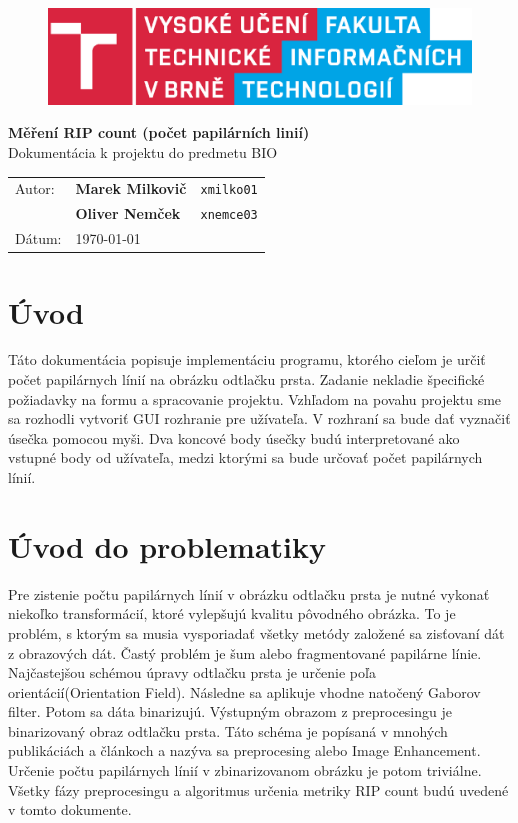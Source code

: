 \documentclass[11pt,a4paper]{article}
\begin{document}
	
\begin{figure}[h]
\includegraphics[scale=0.35]{FIT_barevne_PANTONE_CZ.eps}
\end{figure}


\noindent \textbf{\Large{Měření RIP count}  (počet papilárních linií)} \\ 
Dokumentácia k projektu do predmetu BIO

\vspace{0.5cm}

\noindent\begin{tabular}{@{}lll}
Autor:  &\textbf{Marek Milkovič} & \texttt{xmilko01}\\
  &\textbf{Oliver Nemček} & \texttt{xnemce03} \\
Dátum:  & \today
\end{tabular}

\section*{Úvod}
Táto dokumentácia popisuje implementáciu programu, ktorého cieľom je určiť počet papilárnych línií na obrázku odtlačku prsta. Zadanie nekladie špecifické požiadavky na formu a spracovanie projektu. Vzhľadom na povahu projektu sme sa rozhodli vytvoriť GUI rozhranie pre užívateľa. V rozhraní sa bude dať vyznačiť úsečka pomocou myši. Dva koncové body úsečky budú interpretované ako vstupné body od užívateľa, medzi ktorými sa bude určovať počet papilárnych línií.

\section*{Úvod do problematiky}
Pre zistenie počtu papilárnych línií v obrázku odtlačku prsta je nutné vykonať niekoľko transformácií, ktoré vylepšujú kvalitu pôvodného obrázka. To je problém, s ktorým sa musia vysporiadať všetky metódy založené sa zisťovaní dát z obrazových dát. Častý problém je šum alebo fragmentované papilárne línie. Najčastejšou schémou úpravy odtlačku prsta je určenie poľa orientácií(Orientation Field). Následne sa aplikuje vhodne natočený Gaborov filter. Potom sa dáta binarizujú. Výstupným obrazom z preprocesingu je binarizovaný obraz odtlačku prsta. Táto schéma je popísaná v mnohých publikáciách a článkoch \cite{hong, thai} a nazýva sa preprocesing alebo Image Enhancement. Určenie počtu papilárnych línií v zbinarizovanom obrázku je potom triviálne. Všetky fázy preprocesingu a algoritmus určenia metriky RIP count budú uvedené v tomto dokumente.
\end{document}
